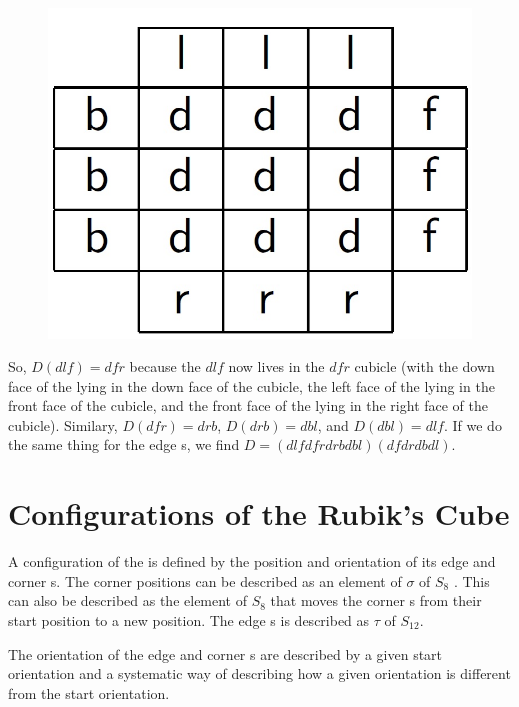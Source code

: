 \begin{figure}[htbp]
	\centering
		\includegraphics{input/pics/rubiks2.jpg}
		\caption{}
	\label{fig:rubiks2}
\end{figure}

So, $D(dlf) = dfr$ because the $dlf$ \cpiece{} now lives in the $dfr$ cubicle (with the down face of the \cpiece{} lying in the down
face of the cubicle, the left face of the \cpiece{} lying in the front face of the cubicle, and the front face of the \cpiece{} lying
in the right face of the cubicle). Similary, $D(dfr) = drb$, $D(drb) = dbl$, and $D(dbl) = dlf$. If we do the same thing
for the edge \cpiece{}s, we find $D = (dlf dfr drb dbl)(df dr db dl)$.

\section{Configurations of the Rubik's Cube}

A configuration of the \rubik{} is defined by the position and orientation of its edge and corner \cpiece{}s. The corner \cpiece{} positions can be described as an element of $\sigma$ of $S_8$ . This can also be described as the element of $S_8$ that moves the corner \cpiece{}s from their start position to a new position. The edge \cpiece{}s is described as $\tau$ of $S_12$. 

The orientation of the edge and corner \cpiece{}s are described by a given start orientation and a systematic way of describing how a given orientation is different from the start orientation. 

\myTail{
}
%